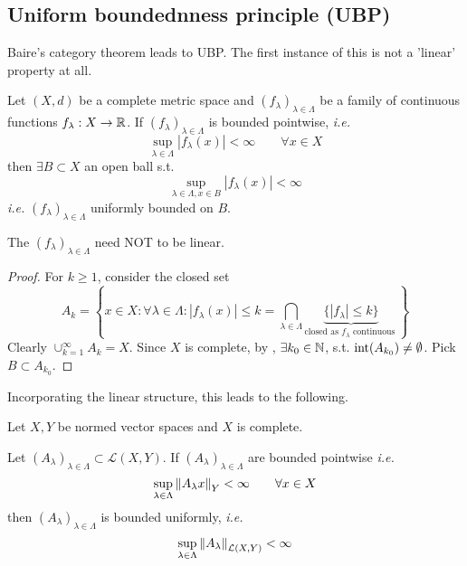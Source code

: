 \documentclass{article}
\begin{document}
\subsection{Uniform boundednness principle (UBP)}

Baire's category theorem leads to UBP. The first instance of this is not a 'linear' property at all.

\begin{theorem}
\label{uniform bounded but not linear}
    Let $(X,d)$ be a complete metric space and $(f_\lambda)_{\lambda \in \Lambda}$ be a family of continuous functions $f_{\lambda}:X \to \mathbb{R}$. If $(f_\lambda)_{\lambda \in \Lambda}$ is bounded pointwise, \textit{i.e.}  
    $$
    \sup_{\lambda \in \Lambda} |f_\lambda(x)| < \infty \qquad \forall x \in X
    $$
    then $\exists B\subset X$ an open ball s.t. 
    $$
    \sup_{\lambda \in \Lambda, x\in B} |f_{\lambda}(x)|<\infty
    $$
    \textit{i.e.} $(f_{\lambda})_{\lambda \in \Lambda}$ uniformly bounded on $B$.
\end{theorem}
\begin{remark}
    The $(f_\lambda)_{\lambda \in \Lambda}$ need NOT to be linear.
\end{remark}
\begin{proof}
    For $k\geq 1$, consider the closed set  
    $$
    A_k = \left\{x \in X: \forall \lambda \in \Lambda: |f_{\lambda}(x)|\leq k = \bigcap_{\lambda\in \Lambda} \underbrace{\{|f_{\lambda}|\leq k\}}_{\text{closed\ as\ $f_{\lambda}$\ continuous\ }}\right\}
    $$
    Clearly $\cup_{k=1}^{\infty}A_k=X$. Since $X$ is complete,  
    by , $\exists k_0 \in \mathbb{N}$, s.t. $\textrm{int} (A_{k_0})\neq \emptyset$. Pick $B\subset A_{k_0}$.
\end{proof}



Incorporating the linear structure, this leads to the following.  

\begin{corollary}\nl
\label{banach steinhaus}
Let $X,Y$ be normed vector spaces and $X$ is complete.  

Let $(A_\lambda)_{\lambda \in \Lambda} \subset \mathcal{L}(X,Y)$. If $(A_{\lambda})_{\lambda \in \Lambda}$ are bounded pointwise \textit{i.e.}  
$$
\sup_{\lambda \in \Lambda} \left\|{A_\lambda x}\right\|_Y < \infty \qquad \forall x\in X
$$  
then $(A_{\lambda})_{\lambda \in \Lambda}$ is bounded uniformly, \textit{i.e.}  
$$
\sup_{\lambda \in \Lambda} \left\|{A_\lambda}\right\|_{\mathcal{L}(X,Y)} < \infty
$$
\end{corollary}
\end{document}

